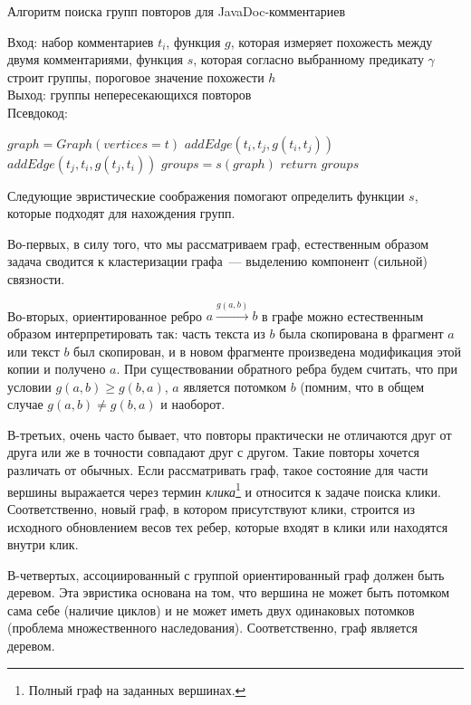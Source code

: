 \begin{algorithm}[t!]
\caption{Алгоритм поиска групп повторов для JavaDoc-комментариев}\label{alg:groupDuplicate}
Вход: набор комментариев $t_{i}$, функция $g$, которая измеряет похожесть между двумя комментариями, функция $s$, которая согласно выбранному предикату $\gamma$ строит группы, пороговое значение похожести $h$\\
Выход: группы непересекающихся повторов\\
Псевдокод:
\begin{algorithmic}[1]
\State $graph = Graph(vertices=t)$
\State $addEdge(t_{i},t_{j},g(t_{i},t_{j}))$
\EndIf
{}
\State $addEdge(t_{j},t_{i},g(t_{j},t_{i}))$
\EndIf
\EndFor
\EndFor
\State $groups = s(graph)$
\State $return$ $groups$
\end{algorithmic}
\end{algorithm}


Следующие эвристические соображения помогают определить функции $s$, которые подходят для нахождения групп.

Во-первых, в силу того, что мы рассматриваем граф, естественным образом задача сводится к кластеризации графа~--- выделению компонент (сильной) связности.

Во-вторых, ориентированное ребро $a \xrightarrow{g(a,b)} b$ в графе можно естественным образом интерпретировать так: часть текста из $b$ была скопирована в фрагмент $a$ или текст $b$ был скопирован, и в новом фрагменте произведена модификация этой копии и получено $a$.
При существовании обратного ребра будем считать, что при условии $g(a,b)\geq g(b,a)$, $a$ является потомком $b$ (помним, что в общем случае $g(a,b)\neq g(b,a)$ и наоборот.

В-третьих, очень часто бывает, что повторы практически не отличаются друг от друга или же в точности совпадают друг с другом.
Такие повторы хочется различать от обычных.
Если рассматривать граф, такое состояние для части вершины выражается через термин \emph{клика}\footnote{Полный граф на заданных вершинах.} и относится к задаче поиска клики.
Соответственно, новый граф, в котором присутствуют клики, строится из исходного обновлением весов тех ребер, которые входят в клики или находятся внутри клик.


В-четвертых, ассоциированный с группой ориентированный граф должен быть деревом.
Эта эвристика основана на том, что вершина не может быть потомком сама себе (наличие циклов) и не может иметь двух одинаковых потомков (проблема множественного наследования).
Соответственно, граф является деревом.  

